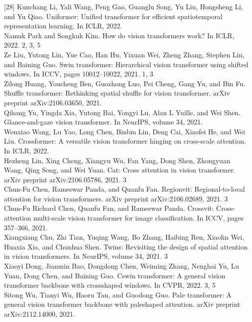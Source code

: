 \documentclass{article}
\begin{document}
[28] Kunchang Li, Yali Wang, Peng Gao, Guanglu Song, Yu Liu, Hongsheng Li, and Yu Qiao. Uniformer: Unified transformer for efficient spatiotemporal representation learning. In ICLR, 2022.\\
[29] Namuk Park and Songkuk Kim. How do vision transformers work? In ICLR, 2022. 2, 3, 5\\
[30] Ze Liu, Yutong Lin, Yue Cao, Han Hu, Yixuan Wei, Zheng Zhang, Stephen Lin, and Baining Guo. Swin transformer: Hierarchical vision transformer using shifted windows. In ICCV, pages 10012–10022, 2021. 1, 3\\
[31] Zilong Huang, Youcheng Ben, Guozhong Luo, Pei Cheng, Gang Yu, and Bin Fu. Shuffle transformer: Rethinking spatial shuffle for vision transformer. arXiv preprint arXiv:2106.03650, 2021.\\
[32] Qihang Yu, Yingda Xia, Yutong Bai, Yongyi Lu, Alan L Yuille, and Wei Shen. Glance-and-gaze vision transformer. In NeurIPS, volume 34, 2021.\\
[33] Wenxiao Wang, Lu Yao, Long Chen, Binbin Lin, Deng Cai, Xiaofei He, and Wei Liu. Crossformer: A versatile vision transformer hinging on cross-scale attention. In ICLR, 2022.\\
[34] Hezheng Lin, Xing Cheng, Xiangyu Wu, Fan Yang, Dong Shen, Zhongyuan Wang, Qing Song, and Wei Yuan. Cat: Cross attention in vision transformer. arXiv preprint arXiv:2106.05786, 2021. 3\\
[35] Chun-Fu Chen, Rameswar Panda, and Quanfu Fan. Regionvit: Regional-to-local attention for vision transformers. arXiv preprint arXiv:2106.02689, 2021. 3\\
[36] Chun-Fu Richard Chen, Quanfu Fan, and Rameswar Panda. Crossvit: Cross-attention multi-scale vision transformer for image classification. In ICCV, pages 357–366, 2021.\\
[37] Xiangxiang Chu, Zhi Tian, Yuqing Wang, Bo Zhang, Haibing Ren, Xiaolin Wei, Huaxia Xia, and Chunhua Shen. Twins: Revisiting the design of spatial attention in vision transformers. In NeurIPS, volume 34, 2021. 3\\
[38] Xiaoyi Dong, Jianmin Bao, Dongdong Chen, Weiming Zhang, Nenghai Yu, Lu Yuan, Dong Chen, and Baining Guo. Cswin transformer: A general vision transformer backbone with crossshaped windows. In CVPR, 2022. 3, 5\\
[39] Sitong Wu, Tianyi Wu, Haoru Tan, and Guodong Guo. Pale transformer: A general vision transformer backbone with paleshaped attention. arXiv preprint arXiv:2112.14000, 2021.\\
\end{document}
